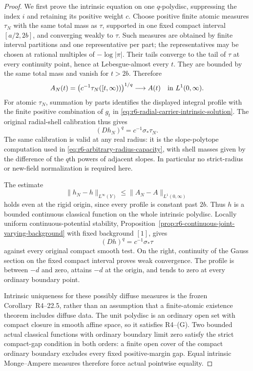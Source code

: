 \documentclass[11pt,a4paper]{article}
\numberwithin{equation}{section}
\theoremstyle{definition}
\theoremstyle{remark}
\begin{document}
\begin{proof}
We first prove the intrinsic equation on one $q$-polydisc, suppressing
the index $i$ and retaining its positive weight $c$. Choose positive
finite atomic measures $\tau_N$ with the same total mass as $\tau$,
supported in one fixed compact interval $[a/2,2b]$, and converging
weakly to $\tau$. Such measures are obtained by finite interval
partitions and one representative per part; the representatives may
be chosen at rational multiples of $-\log|\pi|$. Their tails
converge to the tail of $\tau$ at every continuity point, hence at
Lebesgue-almost every $t$. They are bounded by the same total mass
and vanish for $t>2b$. Therefore
\[
 A_N(t)=\bigl(c^{-1}\tau_N([t,\infty))\bigr)^{1/q}
                     \longrightarrow A(t)
                \quad\hbox{in }L^1(0,\infty).
\]
For atomic $\tau_N$, summation by parts identifies the displayed
integral profile with the finite positive combination of $g_t$ in
\eqref{eq:r6-radial-carrier-intrinsic-solution}. The original
radial-shell calibration thus gives
\[
                     (Dh_N)^q=c^{-1}\sigma_*\tau_N.
\]
The same calibration is valid at any real radius: it is the
slope-polytope computation used in
\eqref{eq:r6-arbitrary-radius-capacity}, with shell masses given by
the difference of the $q$th powers of adjacent slopes. In particular
no strict-radius or new-field normalization is required here.

The estimate
\[
                   \|h_N-h\|_{L^\infty(Y)}
                         \le\|A_N-A\|_{L^1(0,\infty)}
\]
holds even at the rigid origin, since every profile is constant past
$2b$. Thus $h$ is a bounded continuous classical function on the
whole intrinsic polydisc. Locally uniform continuous-potential
stability, Proposition~\ref{prop:r6-continuous-joint-varying-background}
with fixed background $[1]$, gives
\[
                         (Dh)^q=c^{-1}\sigma_*\tau
\]
against every original compact smooth test. On the right, continuity
of the Gauss section on the fixed compact interval proves weak
convergence. The profile is between $-d$ and zero, attains $-d$ at
the origin, and tends to zero at every ordinary boundary point.

Intrinsic uniqueness for these possibly diffuse measures is the
frozen Corollary~\textup{R4--22.5}, rather than an
assumption that a finite-atomic existence theorem includes diffuse
data. The unit polydisc is an ordinary open set with compact closure
in smooth affine space, so it satisfies
\textup{R4--(G)}. Two bounded actual classical functions
with ordinary boundary limit zero satisfy the strict compact-gap
condition in both orders: a finite open cover of the compact ordinary
boundary excludes every fixed positive-margin gap. Equal intrinsic
Monge--Ampere measures therefore force actual pointwise equality.


\end{proof}
\end{document}
